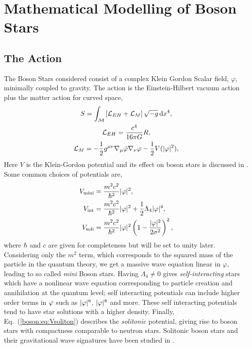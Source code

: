 





\section{Mathematical Modelling of Boson Stars}
\subsection{The Action} \label{boson:sec:action}
The Boson Stars considered \color{orchid} consist of a \color{black} complex Klein Gordon Scalar field, $\varphi$, minimally coupled to gravity. The action is the Einstein-Hilbert vacuum action plus the matter action for curved space,
\begin{gather} S = \int_\mathcal{M}\left[\mathcal{L}_{EH} + \mathcal{L}_M\right] \sqrt{-g}\,\dd x^4, \\
 \mathcal{L}_{EH} = \frac{c^4}{16\pi G}R, \\
 \mathcal{L}_{M} =-\frac{1}{2}g^{\mu\nu}\nabla_\mu \bar{\varphi} \nabla_\nu \varphi - \frac{1}{2}V(|\varphi|^2),  \end{gather}
Here $V$ is the Klein-Gordon potential and its effect on boson stars is discussed in \cite{Schunck:2003kk} \cite{Liebling:2012fv}. Some common choices of potentials are,
\begin{align}
V_{\rm mini} &= \frac{m^2 c^2}{\hbar^2 }|\varphi|^2,\label{boson:eq:Vmini} \\
V_{\rm int} &= \frac{m^2 c^2}{\hbar^2 }|\varphi|^2 + \frac{1}{2}\Lambda_4|\varphi|^4 ,\\
V_{\rm soli} &= \frac{m^2 c^2}{\hbar^2 }|\varphi|^2\left(1-\frac{|\varphi|^2}{2\sigma^2}\right)^2 , \label{boson:eq:Vsoliton}
\end{align}
where $\hbar$ and $c$ are given for completeness but will be set to unity later.
Considering only the $m^2$ term, which corresponds to the squared mass of the particle in the quantum theory, we get a massive wave equation linear in $\varphi$, leading to so called {\it mini} Boson stars. Having $\Lambda_4\neq0$ gives {\it self-interacting} stars which have a nonlinear wave equation corresponding to particle creation and annihilation at the quantum level; self interacting potentials can include higher order terms in $\varphi$ such as $|\varphi|^6$, $|\varphi|^8$ and more. These self interacting potentials tend to have star solutions with a higher density. Finally, Eq.~(\ref{boson:eq:Vsoliton}) describes the {\it solitonic} potential, giving rise to boson stars with compactness comparable to neutron stars. Solitonic boson stars and their gravitational
wave signatures have been studied in \cite{Palenzuela:2017kcg}.

